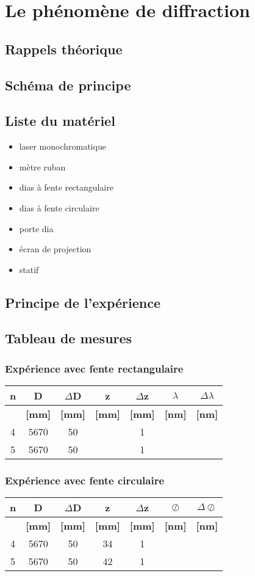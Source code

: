 \documentclass[11pt,a4paper]{report}
\begin{document}
\tableofcontents
\chapter{Le phénomène de diffraction}
	\section{Rappels théorique}
	\section{Schéma de principe}
	\section{Liste du matériel}
	\begin{itemize}
	\item laser monochromatique
	\item mètre ruban
	\item dias à fente rectangulaire
	\item dias à fente circulaire
	\item porte dia
	\item écran de projection
	\item statif
	\end{itemize}
	\section{Principe de l'expérience}
	\section{Tableau de mesures}
	\subsection{Expérience avec fente rectangulaire}
	\begin{tabular}{|c|c|c|c|c|c|c|}
		\hline
		\bf n & \bf D & \bf $\Delta$D & \bf z & \bf $\Delta$z & \bf $\lambda$& \bf $\Delta\lambda$ \\
		\hline
		 & \bf [mm] & \bf [mm] & \bf [mm] & \bf [mm] & \bf [nm]  & \bf [nm] \\
		\hline
		4 & 5670 & 50 &  &  1 &&  \\
		5 & 5670 & 50 &  &  1 && \\
		\hline
	\end{tabular}
	\subsection{Expérience avec fente circulaire}
	\begin{tabular}{|c|c|c|c|c|c|c|}
		\hline
		\bf n & \bf D & \bf $\Delta$D & \bf z & \bf $\Delta$z & \bf $\oslash$& \bf $\Delta\oslash$ \\
		\hline
		 & \bf [mm] & \bf [mm] & \bf [mm] & \bf [mm] & \bf [nm]  & \bf [nm] \\
		\hline
		4 & 5670 & 50 & 34&  1 &&  \\
		5 & 5670 & 50 & 42&  1 && \\
		\hline
	\end{tabular}
\end{document}
